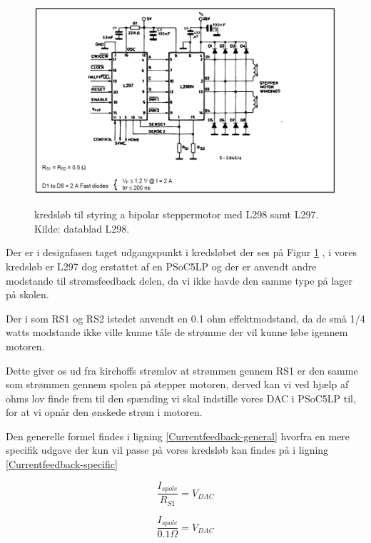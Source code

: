 \begin{figure}[H]
	\centering
	\caption{kredsløb til styring a bipolar steppermotor med L298 samt L297. Kilde: datablad L298.}
	\includegraphics[scale=0.5]{billeder/kredsloebL297L298}
	\label{L298L297}
\end{figure}

Der er i designfasen taget udgangspunkt i kredsløbet der ses på Figur \ref{L298L297} , i vores kredsløb er L297 dog erstattet af en PSoC5LP og der er anvendt andre modstande til strømsfeedback delen, da vi ikke havde den samme type på lager på skolen.

Der i som RS1 og RS2 istedet anvendt en 0.1 ohm effektmodstand, da de små 1/4 watts modstande ikke ville kunne tåle de strømme der vil kunne løbe igennem motoren.

Dette giver os ud fra kirchoffs strømlov at strømmen gennem RS1 er den samme som strømmen gennem spolen på stepper motoren, derved kan vi ved hjælp af ohms lov finde frem til den spænding vi skal indstille vores DAC i PSoC5LP til, for at vi opnår den ønskede strøm i motoren.

Den generelle formel findes i ligning \ref{Currentfeedback-general} hvorfra en mere specifik udgave der kun vil passe på vores kredsløb kan findes på i ligning \ref{Currentfeedback-specific}

\begin{equation}
\label{Currentfeedback-general}
	\frac{I_{spole}}{R_{S1}}=V_{DAC}
\end{equation}

\begin{equation}
\label{Currentfeedback-specific}
\frac{I_{spole}}{0.1\Omega}=V_{DAC}
\end{equation}


	
